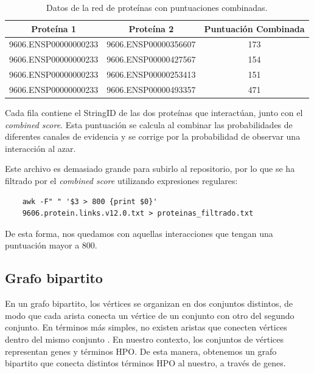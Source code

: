
\begin{table}[h]
	\centering
	\caption{Datos de la red de proteínas con puntuaciones combinadas.}
	\label{tabla:redProteinas} 
	\begin{tabular}{|c|c|c|}
		\hline
		\textbf{Proteína 1} & \textbf{Proteína 2} & \textbf{Puntuación Combinada} \\
		\hline
		9606.ENSP00000000233 & 9606.ENSP00000356607 & 173 \\
		9606.ENSP00000000233 & 9606.ENSP00000427567 & 154 \\
		9606.ENSP00000000233 & 9606.ENSP00000253413 & 151 \\
		9606.ENSP00000000233 & 9606.ENSP00000493357 & 471 \\
		\hline
	\end{tabular}
\end{table}

Cada fila contiene el StringID de las dos proteínas que interactúan, junto con el \textit{combined score}. Esta puntuación se calcula al combinar las probabilidades de diferentes canales de evidencia y se corrige por la probabilidad de observar una interacción al azar.

Este archivo es demasiado grande para subirlo al repositorio, por lo que se ha filtrado por el \textit{combined score} utilizando expresiones regulares:

\begin{verbatim}
	awk -F" " '$3 > 800 {print $0}'
	9606.protein.links.v12.0.txt > proteinas_filtrado.txt
\end{verbatim}

De esta forma, nos quedamos con aquellas interacciones que tengan una puntuación mayor a 800.

\subsection{Grafo bipartito}

En un grafo bipartito, los vértices se organizan en dos conjuntos distintos, de modo que cada arista conecta un vértice de un conjunto con otro del segundo conjunto. En términos más simples, no existen aristas que conecten vértices dentro del mismo conjunto \cite{BiRank2017}. En nuestro contexto, los conjuntos de vértices representan genes y términos HPO. De esta manera, obtenemos un grafo bipartito que conecta distintos términos HPO al nuestro, a través de genes. 

